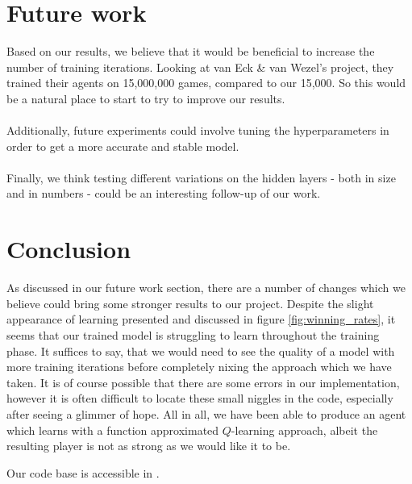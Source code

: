 \documentclass{article}
\begin{document}
\section{Future work}
Based on our results, we believe that it would be beneficial to increase the number of training iterations. Looking at van Eck \& van Wezel's project, they trained their agents on 15,000,000 games, compared to our 15,000. So this would be a natural place to start to try to improve our results.
\\\\
Additionally, future experiments could involve tuning the hyperparameters in order to get a more accurate and stable model.
\\\\
Finally, we think testing different variations on the hidden layers - both in size and in numbers - could be an interesting follow-up of our work. 

\section{Conclusion}
As discussed in our future work section, there are a number of changes which we believe could bring some stronger results to our project. Despite the slight appearance of learning presented and discussed in figure \ref{fig:winning_rates}, it seems that our trained model is struggling to learn throughout the training phase. It suffices to say, that we would need to see the quality of a model with more training iterations before completely nixing the approach which we have taken. It is of course possible that there are some errors in our implementation, however it is often difficult to locate these small niggles in the code, especially after seeing a glimmer of hope. All in all, we have been able to produce an agent which learns with a function approximated $Q$-learning approach, albeit the resulting player is not as strong as we would like it to be.

Our code base is accessible in \cite{our_code}.
\\\\\\\\\\\\\\\\\\\\\\\\\\\\\\\\\\\\\\\\\\\\\\\\\\\\\\
\printbibliography
\end{document}
